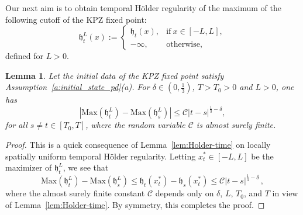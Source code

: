 \documentclass[oneside,final,11pt]{amsart}
\newtheorem{lem}[thm]{Lemma}
\theoremstyle{definition}
\newcommand{\fh}{\mathfrak{h}}
\newcommand{\CC}{\mathcal{C}}
\newcommand{\1}[1]{\mathbf{1}_{#1}}
\newcommand{\km}[1]{\marginnote{\tiny{\color{red}[KM: #1]}}}
\newcommand{\mc}{\mathcal}
\newcommand{\Max}{\mathrm{Max}}
\numberwithin{equation}{section}
\begin{document}
Our next aim is to obtain temporal H\"{o}lder regularity of the maximum of the following cutoff of the KPZ fixed point:
\begin{equation}\label{eq:cut-off}
\fh_t^L(x) :=
\begin{cases}
\fh_t(x), &\text{if}~ x \in [-L, L],\\
-\infty, &\text{otherwise},
\end{cases}
\end{equation}
defined for $L > 0$.

\begin{lem}\label{lem:max_Holder}
Let the initial data of the KPZ fixed point satisfy Assumption~\ref{a:initial_state_pd}(a). For  $\delta \in (0, \frac{1}{3})$, $T >T_0> 0$ and $L > 0$, one has%
%
\begin{equation}\label{eq:max_Holder}
|\Max(\fh^L_{t}) - \Max(\fh_{s}^L)|\leq \CC |t-s|^{\frac{1}{3} - \delta},
\end{equation}
%
for all $s \neq t \in [T_0,T]$, where the random variable $\CC$ is almost surely finite.
 \end{lem}

\begin{proof}
This is a quick consequence of Lemma~\ref{lem:Holder-time} on locally spatially uniform temporal H\"older regularity. Letting $x_t^*\in [-L,L]$ be the maximizer of $\fh_t^L$, we see that
%
$$\Max(\fh^L_{t}) - \Max(\fh_{s}^L) \leq \fh_t(x^*_t) - \fh_s(x^*_t) \leq \mc C |t-s|^{\frac{1}{3}-\delta} \, ,$$
%
where the almost surely finite constant $\mc C$ depends only on $\delta$, $L$, $T_0$, and $T$ in view of Lemma~\ref{lem:Holder-time}. By symmetry, this completes the proof.
\end{proof}
\end{document}
